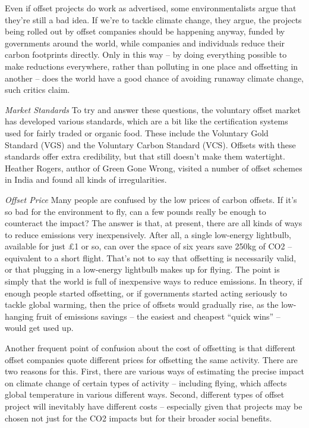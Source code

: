 \documentclass[
]{book}
\begin{document}
Even if offset projects do work as advertised, some environmentalists argue that they're still a bad idea. If we're to tackle climate change, they argue, the projects being rolled out by offset companies should be happening anyway, funded by governments around the world, while companies and individuals reduce their carbon footprints directly. Only in this way -- by doing everything possible to make reductions everywhere, rather than polluting in one place and offsetting in another -- does the world have a good chance of avoiding runaway climate change, such critics claim.

\emph{Market Standards}
To try and answer these questions, the voluntary offset market has developed various standards, which are a bit like the certification systems used for fairly traded or organic food. These include the Voluntary Gold Standard (VGS) and the Voluntary Carbon Standard (VCS).
Offsets with these standards offer extra credibility, but that still doesn't make them watertight. Heather Rogers, author of Green Gone Wrong, visited a number of offset schemes in India and found all kinds of irregularities.

\emph{Offset Price}
Many people are confused by the low prices of carbon offsets. If it's so bad for the environment to fly, can a few pounds really be enough to counteract the impact? The answer is that, at present, there are all kinds of ways to reduce emissions very inexpensively. After all, a single low-energy lightbulb, available for just £1 or so, can over the space of six years save 250kg of CO2 -- equivalent to a short flight. That's not to say that offsetting is necessarily valid, or that plugging in a low-energy lightbulb makes up for flying. The point is simply that the world is full of inexpensive ways to reduce emissions. In theory, if enough people started offsetting, or if governments started acting seriously to tackle global warming, then the price of offsets would gradually rise, as the low-hanging fruit of emissions savings -- the easiest and cheapest ``quick wins'' -- would get used up.

Another frequent point of confusion about the cost of offsetting is that different offset companies quote different prices for offsetting the same activity. There are two reasons for this. First, there are various ways of estimating the precise impact on climate change of certain types of activity -- including flying, which affects global temperature in various different ways. Second, different types of offset project will inevitably have different costs -- especially given that projects may be chosen not just for the CO2 impacts but for their broader social benefits.
\end{document}
